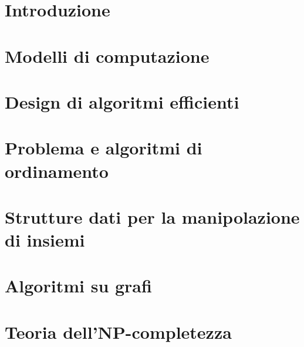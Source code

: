 \documentclass[12pt]{article}
\begin{document}


\tableofcontents
\restoregeometry

\section{Introduzione}


\section{Modelli di computazione}


\section{Design di algoritmi efficienti}


\section{Problema e algoritmi di ordinamento}


\section{Strutture dati per la manipolazione di insiemi}


\section{Algoritmi su grafi}


\section{Teoria dell'NP-completezza}

\end{document}
